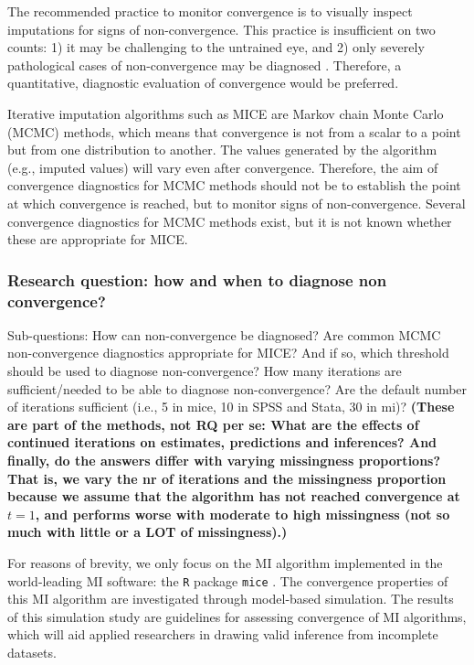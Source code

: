\documentclass[Royal,times,sageh]{sagej}
\begin{document}
The recommended practice to monitor convergence is to visually inspect
imputations for signs of non-convergence. This practice is insufficient
on two counts: 1) it may be challenging to the untrained eye, and 2)
only severely pathological cases of non-convergence may be diagnosed
\citep[\(\S\) 6.5.2]{buur18}. Therefore, a quantitative, diagnostic
evaluation of convergence would be preferred.

Iterative imputation algorithms such as MICE are Markov chain Monte
Carlo (MCMC) methods, which means that convergence is not from a scalar
to a point but from one distribution to another. The values generated by
the algorithm (e.g., imputed values) will vary even after convergence.
Therefore, the aim of convergence diagnostics for MCMC methods should
not be to establish the point at which convergence is reached, but to
monitor signs of non-convergence. Several convergence diagnostics for
MCMC methods exist, but it is not known whether these are appropriate
for MICE.

\hypertarget{research-question-how-and-when-to-diagnose-non-convergence}{%
\subsubsection{Research question: how and when to diagnose non
convergence?}\label{research-question-how-and-when-to-diagnose-non-convergence}}

Sub-questions: How can non-convergence be diagnosed? Are common MCMC
non-convergence diagnostics appropriate for MICE? And if so, which
threshold should be used to diagnose non-convergence? How many
iterations are sufficient/needed to be able to diagnose non-convergence?
Are the default number of iterations sufficient (i.e., 5 in mice, 10 in
SPSS and Stata, 30 in mi)? \textbf{(These are part of the methods, not
RQ per se: What are the effects of continued iterations on estimates,
predictions and inferences? And finally, do the answers differ with
varying missingness proportions? That is, we vary the nr of iterations
and the missingness proportion because we assume that the algorithm has
not reached convergence at \(t=1\), and performs worse with moderate to
high missingness (not so much with little or a LOT of missingness).)}

For reasons of brevity, we only focus on the MI algorithm implemented in
the world-leading MI software: the \texttt{R} \citep{R} package
\texttt{mice} \citep{mice}. The convergence properties of this MI
algorithm are investigated through model-based simulation. The results
of this simulation study are guidelines for assessing convergence of MI
algorithms, which will aid applied researchers in drawing valid
inference from incomplete datasets.
\end{document}
